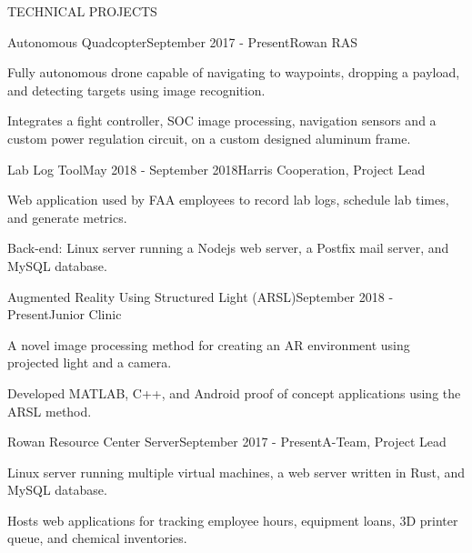 \documentclass{resume} %
\begin{document}
\begin{rSection}{TECHNICAL PROJECTS}


\begin{rSubsection}{Autonomous Quadcopter}{September 2017 - Present}{Rowan RAS}{}
\item Fully autonomous drone capable of navigating to waypoints, dropping a
  payload, and detecting targets using image recognition.
\item Integrates a fight controller, SOC image processing, navigation sensors
  and a custom power regulation circuit, on a custom designed aluminum frame.
\end{rSubsection}


\begin{rSubsection}{Lab Log Tool}{May 2018 - September 2018}{Harris Cooperation, Project Lead}{}
\item Web application used by FAA employees to record lab logs, schedule lab times, and generate metrics.
\item Back-end: Linux server running a Nodejs web server, a Postfix mail server, and MySQL database.
\end{rSubsection}


\begin{rSubsection}{Augmented Reality Using Structured Light (ARSL)}{September 2018 - Present}{Junior Clinic}{}
\item A novel image processing method for creating an AR environment using
  projected light and a camera.
\item Developed MATLAB, C++, and Android proof of concept applications using the
  ARSL method.
\end{rSubsection}


\begin{rSubsection}{Rowan Resource Center Server}{September 2017 - Present}{A-Team, Project Lead}{}
\item Linux server running multiple virtual machines, a web server written in Rust, and MySQL database.
\item Hosts web applications for tracking employee hours, equipment loans, 3D printer queue, and chemical inventories.
\end{rSubsection}


\end{rSection}
\end{document}
